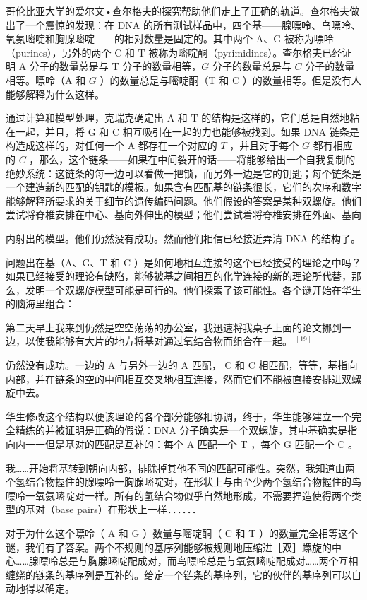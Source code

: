 哥伦比亚大学的爱尔文•查尔格夫的探究帮助他们走上了正确的轨道。查尔格夫做出了一个震惊的发现：在 DNA 的所有测试样品中，四个基——腺嘌呤、乌嘌呤、氧氨嘧啶和胸腺嘧啶——的相对数量是固定的。其中两个 $\mathrm{A} 、 \mathrm{G}$ 被称为嘌呤（purines），另外的两个 C 和 T 被称为嘧啶酮（pyrimidines）。查尔格夫已经证明 A 分子的数量总是与 T 分子的数量相等，$G$ 分子的数量总是与 $C$ 分子的数量相等。嘌呤（A 和 $G$ ）的数量总是与嘧啶酮（T 和 C ）的数量相等。但是没有人能够解释为什么这样。

通过计算和模型处理，克瑞克确定出 A 和 T 的结构是这样的，它们总是自然地粘在一起，并且，将 G 和 C 相互吸引在一起的力也能够被找到。如果 DNA 链条是构造成这样的，对任何一个 A 都存在一个对应的 $T$ ，并且对于每个 $G$ 都有相应的 $C$ ，那么，这个链条——如果在中间裂开的话——将能够给出一个自我复制的绝妙系统：这链条的每一边可以看做一把锁，而另外一边是它的钥匙；每个链条是一个建造新的匹配的钥匙的模板。如果含有匹配基的链条很长，它们的次序和数字能够解释所要求的关于细节的遗传编码问题。他们假设的答案是某种双螺旋。他们尝试将脊椎安排在中心、基向外伸出的模型；他们尝试着将脊椎安排在外面、基向

内射出的模型。他们仍然没有成功。然而他们相信已经接近弄清 DNA 的结构了。

问题出在基（A、G、T 和 C ）是如何地相互连接的这个已经接受的理论之中吗？如果已经接受的理论有缺陷，能够被基之间相互的化学连接的新的理论所代替，那么，发明一个双螺旋模型可能是可行的。他们探索了该可能性。各个谜开始在华生的脑海里组合：

第二天早上我来到仍然是空空荡荡的办公室，我迅速将我桌子上面的论文挪到一边，以使我能够有大片的地方将基对通过氧结合物而组合在一起。 ${ }^{[19]}$

仍然没有成功。一边的 A 与另外一边的 A 匹配， C 和 C 相匹配，等等，基指向内部，并在链条的空的中间相互交叉地相互连接，然而它们不能被直接安排进双螺旋中去。

华生修改这个结构以便该理论的各个部分能够相协调，终于，华生能够建立一个完全精练的并被证明是正确的假说：DNA 分子确实是一个双螺旋，其中基确实是指向内一一但是基对的匹配是互补的：每个 A 匹配一个 T ，每个 G 匹配一个 C 。

我……开始将基转到朝向内部，排除掉其他不同的匹配可能性。突然，我知道由两个氢结合物握住的腺嘌呤一胸腺嘧啶对，在形状上与由至少两个氢结合物握住的鸟嘌呤一氧氨嘧啶对一样。所有的氢结合物似乎自然地形成，不需要捏造使得两个类型的基对（base pairs）在形状上一样．．．．．．

对于为什么这个嘌呤（ A 和 G ）数量与嘧啶酮（ C 和 T ）的数量完全相等这个谜，我们有了答案。两个不规则的基序列能够被规则地压缩进［双］螺旋的中心……腺嘌呤总是与胸腺嘧啶配成对，而鸟嘌呤总是与氧氨嘧啶配成对……两个互相缠绕的链条的基序列是互补的。给定一个链条的基序列，它的伙伴的基序列可以自动地得以确定。

